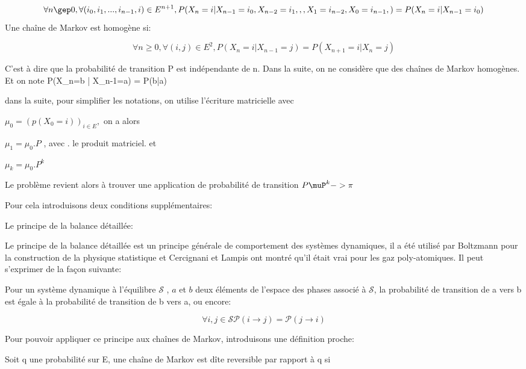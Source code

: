 \begin{equation}
\forall n \gep 0 , \forall (i_0,i_1,...,i_{n-1},i) \in E^{n+1}, P(X_n=i|X_{n-1}=i_0,X_{n-2}=i_1,,,X_{1}=i_{n-2},X_{0}=i_{n-1},) = P(X_n=i|X_{n-1}=i_0) 
\end{equation}
Une chaîne de Markov est homogène si:

\begin{equation}
  \label{eq_homog}
\forall n \geq 0 , \forall (i,j) \in E^2, P(X_n=i|X_{n-1}=j)= P(X_{n+1}=i|X_n=j) 
\end{equation}

C'est à dire que la probabilité de transition P est indépendante de n. Dans la suite, on ne considère que des chaînes de Markov homogènes. Et on note P(X_n=b | X_{n-1}=a) = P(b|a)


dans la suite, pour simplifier les notations, on utilise l'écriture matricielle avec

$\mu_0 =(p(X_0=i))_{i \in E},$
on a alors

$\mu_1 =\mu_0 . P$   , avec . le produit matriciel.
et

$\mu_k =\mu_0 . P^k$

Le problème revient alors à trouver une application de probabilité de transition $P \muP^k -> \pi$

Pour cela introduisons deux conditions supplémentaires:


Le principe de la balance détaillée:

Le principe de la balance détaillée  est un principe générale de comportement des systèmes dynamiques, il a été utilisé par Boltzmann pour la construction de la physique statistique et Cercignani et Lampis ont montré qu'il était vrai pour les gaz poly-atomiques. Il peut s'exprimer de la façon suivante:

Pour un système dynamique à l'équilibre $\mathcal{S}$ , $a$ et $b$ deux éléments de l'espace des phases associé à $\mathcal{S}$, la probabilité de transition de a vers b est égale à la probabilité de transition de b vers a, ou encore: 

\begin{equation}
\forall i,j \in \mathcal{S}
\mathcal{P}(i \rightarrow j) = \mathcal{P}(j \rightarrow i) 
\end{equation}

Pour pouvoir appliquer ce principe aux chaînes de Markov, introduisons une définition proche:

Soit q une probabilité sur E, une chaîne de Markov est dîte reversible par rapport à q si

